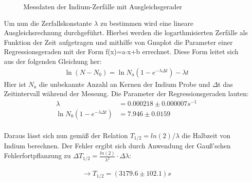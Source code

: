 \begin{figure}[htbp]
\caption{Messdaten der Indium-Zerfälle mit Ausgleichsgerader}
\label{fig:Abbildung}
\end{figure}
Um nun die Zerfallskonstante $\lambda$ zu bestimmen wird eine lineare Ausgleichsrechnung durchgeführt. Hierbei werden die logarthmisierten Zerfälle als Funktion der Zeit aufgetragen und mithilfe von Gnuplot die Parameter einer Regressionsgeraden mit der Form f(x)=a$\cdot$x+b errechnet. Diese Form leitet sich aus der folgenden Gleichung her:
\begin{align*}
\ln(N-N_0)=\ln N_a(1-e^{-\lambda\Delta t})-\lambda t
\end{align*}
Hier ist $N_a$ die unbekannte Anzahl an Kernen der Indium Probe und $\Delta$t das Zeitintervall während der Messung. Die Parameter der Regressionsgeraden lauten:
\begin{align*}
\lambda&=0.000218\pm 0.000007s^{-1}\\
\ln N_0(1-e^{-\lambda\Delta t})&=7.946\pm0.0159\\
\end{align*}

Daraus lässt sich nun gemäß der Relation $T_{1/2}=ln(2)/\lambda$ die Halbzeit von Indium berechnen. Der Fehler ergibt sich durch Anwendung der Gauß'schen Fehlerfortpflanzung zu $\Delta T_{1/2}=\frac{ln(2)}{\lambda^2}\cdot \Delta\lambda$:

\begin{align*}
\rightarrow T_{1/2}=(3179.6\pm 102.1)s
\end{align*}